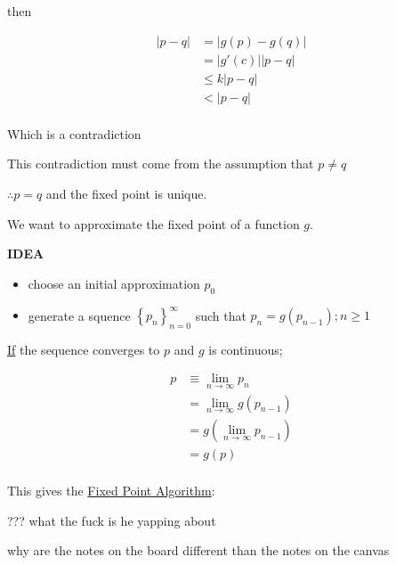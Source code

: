 \documentclass[12pt]{article}
\begin{document}
then 

\begin{align*}
  |p-q| &= |g(p) - g(q)| \\
  &= |g'(c)||p-q| \\
  &\leq k|p-q| \\
  &< |p-q|  \\
\end{align*}

Which is a contradiction

This contradiction must come from the assumption that $p \ne q$

$\therefore p = q$ and the fixed point is unique.

We want to approximate the fixed point of a function $g$.

\textbf{IDEA}

\begin{itemize}
\item choose an initial approximation $p_0$
\item generate a squence $\displaystyle \left\{ p_n \right\}_{n=0}^\infty$
  such that $p_n = g(p_{n-1}); n \geq 1$
\end{itemize}

\uline{If} the sequence converges to $p$ and $g$ is continuous;

\begin{align*}
  p &\equiv \lim_{n\to\infty} p_n \\
  &= \lim_{n\to\infty} g(p_{n-1}) \\
  &=  g(\lim_{n\to\infty} p_{n-1}) \\
  &= g(p) \\
\end{align*}

This gives the \uline{Fixed Point Algorithm}:

??? what the fuck is he yapping about 

why are the notes on the board different than the notes on the canvas
\end{document}
